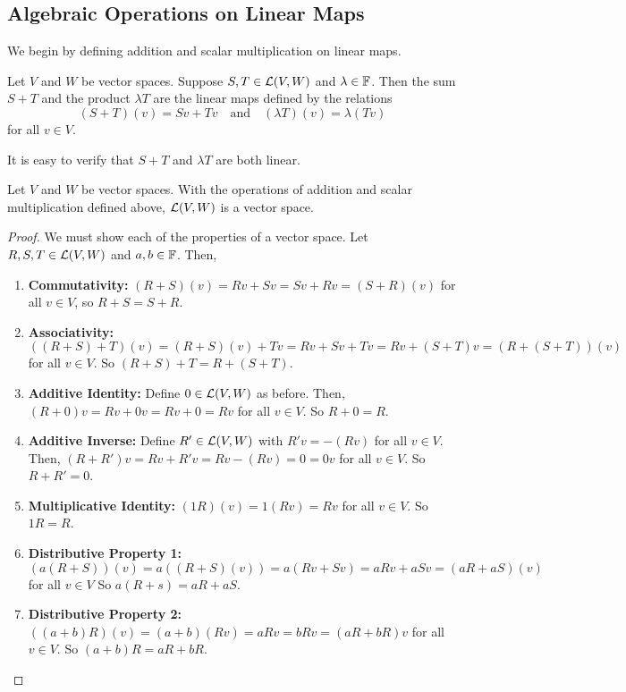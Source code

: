 \subsection*{Algebraic Operations on Linear Maps}
We begin by defining addition and scalar multiplication on linear maps.
\begin{definition}
    Let $V$ and $W$ be vector spaces. Suppose $S,T\in \mathcal{L}(V,W)$ and $\lambda\in\mathbb F$. Then the sum $S+T$ and the product $\lambda T$ are the linear maps defined by the relations
    \[ (S+T)(v) = Sv+  Tv \quad\text{and}\quad (\lambda T)(v) = \lambda (Tv)\]
    for all $v\in V$.
\end{definition}
It is easy to verify that $S+T$ and $\lambda T$ are both linear.   
\begin{theorem}
    Let $V$ and $W$ be vector spaces. With the operations of addition and scalar multiplication defined above, $\mathcal{L}(V,W)$ is a vector space.
\end{theorem}
\begin{proof}
    We must show each of the properties of a vector space. Let $R,S,T\in\mathcal{L}(V,W)$ and $a,b\in \mathbb F$. Then,
    \begin{enumerate}
        \item \textbf{Commutativity:} $(R+S)(v) =Rv + Sv = Sv + Rv = (S+R)(v)$ for all $v\in V$, so $R+S = S+R$.
        \item \textbf{Associativity:} $((R+S)+T)(v) = (R+S)(v) + Tv = Rv + Sv + Tv = Rv + (S+T)v = (R+(S+T))(v)$ for all $v\in V$. So $(R+S)+T = R+(S+T)$.
        \item \textbf{Additive Identity:} Define $0\in\mathcal{L}(V,W)$ as before. Then, $(R+0)v = Rv+0v = Rv+0 = Rv$ for all $v\in V$. So $R+0=R$.
        \item \textbf{Additive Inverse:} Define $R' \in \mathcal{L}(V,W)$ with $R'v = -(Rv)$ for all $v\in V$. Then, $(R+R')v = Rv + R'v = Rv - (Rv) = 0 = 0v$ for all $v\in V$. So $R + R' = 0$. 
        \item \textbf{Multiplicative Identity:} $(1R)(v) = 1(Rv) = Rv$ for all $v\in V$. So $1R = R$.
        \item \textbf{Distributive Property 1:} $(a(R+S))(v) = a((R+S)(v)) = a(Rv+Sv) = aRv + aSv = (aR+aS)(v)$ for all $v\in V$ So $a(R+s) = aR+aS$.
        \item \textbf{Distributive Property 2:} $((a+b)R)(v) = (a+b)(Rv) = aRv = bRv = (aR+bR)v$ for all $v\in V$. So $(a+b)R = aR+bR$.
    \end{enumerate}
\end{proof}
